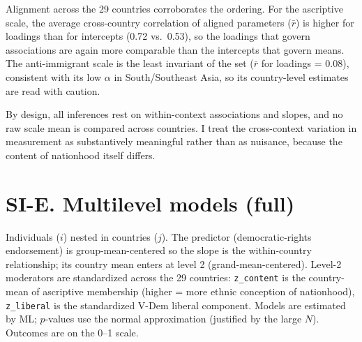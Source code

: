 Alignment across the 29 countries \citep[the alignment method;][]{asparouhov2014alignment} corroborates the ordering. For the ascriptive scale, the average cross-country correlation of aligned parameters (\(\bar r\)) is higher for loadings than for intercepts (0.72 vs.~0.53), so the loadings that govern associations are again more comparable than the intercepts that govern means. The anti-immigrant scale is the least invariant of the set (\(\bar r\) for loadings = 0.08), consistent with its low \(\alpha\) in South/Southeast Asia, so its country-level estimates are read with caution.

By design, all inferences rest on within-context associations and slopes, and no raw scale mean is compared across countries. I treat the cross-context variation in measurement as substantively meaningful rather than as nuisance, because the content of nationhood itself differs.

\clearpage
\section{SI-E. Multilevel models (full)}\label{si-e.-multilevel-models-full}

Individuals (\(i\)) nested in countries (\(j\)). The predictor (democratic-rights endorsement) is group-mean-centered so the slope is the within-country relationship; its country mean enters at level 2 (grand-mean-centered). Level-2 moderators are standardized across the 29 countries: \texttt{z\_content} is the country-mean of ascriptive membership (higher = more ethnic conception of nationhood), \texttt{z\_liberal} is the standardized V-Dem liberal component. Models are estimated by ML; \(p\)-values use the normal approximation (justified by the large \(N\)). Outcomes are on the 0--1 scale.

